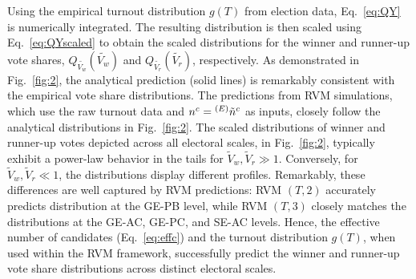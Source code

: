 \documentclass[reprint, pre, twocolumn, aps, showpacs, superscriptaddress]{revtex4-2}
\begin{document}
Using the empirical turnout distribution $g(T)$ from election data, Eq.~\ref{eq:QY} is numerically integrated. The resulting distribution is then scaled using Eq.~\ref{eq:QYscaled} to obtain the scaled distributions for the winner and runner-up vote shares, $ Q_{\widetilde{V_w}}(\widetilde{V_w})$ and $Q_{\widetilde{V_r}}(\widetilde{V_r})$, respectively. As demonstrated in Fig.~\ref{fig:2}, the analytical prediction (solid lines) is remarkably consistent with the empirical vote share distributions. The predictions from RVM simulations, which use the raw turnout data and $n^c = {^{(E)}\Tilde{n}^c}$ as inputs, closely follow the analytical distributions in Fig.~\ref{fig:2}. The scaled distributions of winner and runner-up votes depicted across all electoral scales, in Fig.~\ref{fig:2}, typically exhibit a power-law behavior in the tails for $\widetilde{V}_w, \widetilde{V}_r \gg 1$. Conversely, for $\widetilde{V}_w, \widetilde{V}_r \ll 1$, the distributions display different profiles. Remarkably, these differences are well captured by RVM predictions: RVM $(T, 2)$ accurately predicts distribution at the GE-PB level, while RVM $(T, 3)$ closely matches the distributions at the GE-AC, GE-PC, and SE-AC levels. Hence, the effective number of candidates (Eq.~\ref{eq:effc}) and the turnout distribution $g(T)$, when used within the RVM framework, successfully predict the winner and runner-up vote share distributions across distinct electoral scales.
\end{document}
